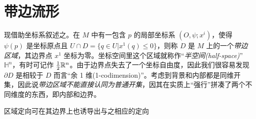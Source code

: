 \section{带边流形}

现借助坐标系叙述之。在 $M$ 中有一包含 $p$ 的局部坐标系 $(O,\psi;x^i)$，使得 $\psi(p)$ 是坐标原点且 $U\cap D =\{q\in U|x^1(q)\leqslant 0\}$，则称 $D$ 是 $M$ 上的一个\textit{带边区域}，其边界点 $x^1$ 坐标为零。坐标空间里这个区域就称作“\textit{半空间(half-space)}” $\mathbb H^{n}$，有时可记作 $\frac{1}{2}\mathbb{R}^n$。由于边界点失去了一个坐标自由度，因此我们很容易发现 $\partial D$ 是相较于 $D$ 而言“余 1 维(1-codimension)”。考虑到背景和内部都是同维开集，因此说\textit{带边区域不能直接认同为普通开集}，因其在实质上“强行”拼凑了两个不同维度的东西，即内部和边界。

区域定向可在其边界上也诱导出与之相应的定向

